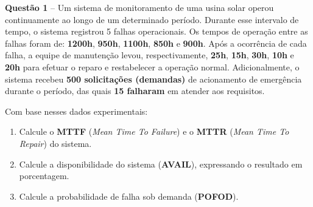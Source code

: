 \documentclass[12pt,a4paper]{article}
\begin{document}
\vspace{0.5cm}

\textbf{Questão 1} -- Um sistema de monitoramento de uma usina solar operou continuamente ao longo de um determinado período. Durante esse intervalo de tempo, o sistema registrou 5 falhas operacionais. Os tempos de operação entre as falhas foram de: \textbf{1200h}, \textbf{950h}, \textbf{1100h}, \textbf{850h} e \textbf{900h}. Após a ocorrência de cada falha, a equipe de manutenção levou, respectivamente, \textbf{25h}, \textbf{15h}, \textbf{30h}, \textbf{10h} e \textbf{20h} para efetuar o reparo e restabelecer a operação normal. Adicionalmente, o sistema recebeu \textbf{500 solicitações (demandas)} de acionamento de emergência durante o período, das quais \textbf{15 falharam} em atender aos requisitos.

\vspace{0.2cm}

Com base nesses dados experimentais:

\begin{enumerate}[label=\textbf{\alph*)}]
    \item Calcule o \textbf{MTTF} (\textit{Mean Time To Failure}) e o \textbf{MTTR} (\textit{Mean Time To Repair}) do sistema.
    \item Calcule a disponibilidade do sistema (\textbf{AVAIL}), expressando o resultado em porcentagem.
    \item Calcule a probabilidade de falha sob demanda (\textbf{POFOD}).
\end{enumerate}

\vspace{0.2cm}
\noindent
{}
\end{document}
